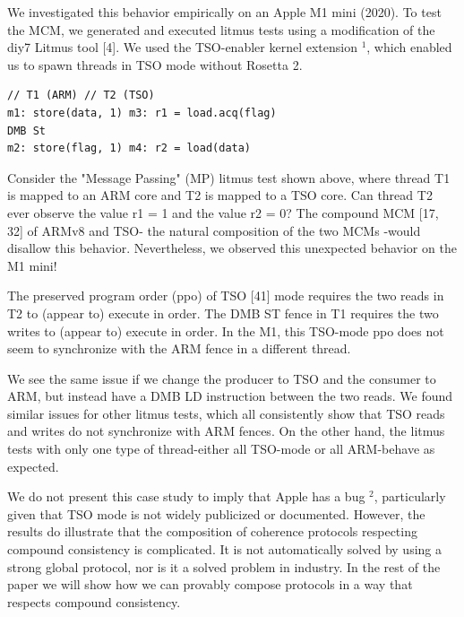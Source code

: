 \documentclass[10pt]{article}
\begin{document}
We investigated this behavior empirically on an Apple M1 mini (2020). To test the MCM, we generated and executed litmus tests using a modification of the diy7 Litmus tool [4]. We used the TSO-enabler kernel extension ${ }^{1}$, which enabled us to spawn threads in TSO mode without Rosetta 2.

\begin{lstlisting}[mathescape=true]
// T1 (ARM) // T2 (TSO)
m1: store(data, 1) m3: r1 = load.acq(flag)
DMB St
m2: store(flag, 1) m4: r2 = load(data)
\end{lstlisting}
Consider the "Message Passing" (MP) litmus test shown above, where thread T1 is mapped to an ARM core and T2 is mapped to a TSO core. Can thread T2 ever observe the value r1 = 1 and the value r2 = 0? The compound MCM [17, 32] of ARMv8 and TSO- the natural composition of the two MCMs -would disallow this behavior. Nevertheless, we observed this unexpected behavior on the M1 mini!

The preserved program order (ppo) of TSO [41] mode requires the two reads in T2 to (appear to) execute in order. The DMB ST fence in T1 requires the two writes to (appear to) execute in order. In the M1, this TSO-mode ppo does not seem to synchronize with the ARM fence in a different thread.

We see the same issue if we change the producer to TSO and the consumer to ARM, but instead have a DMB LD instruction between the two reads. We found similar issues for other litmus tests, which all consistently show that TSO reads and writes do not synchronize with ARM fences. On the other hand, the litmus tests with only one type of thread-either all TSO-mode or all ARM-behave as expected.

We do not present this case study to imply that Apple has a bug ${ }^{2}$, particularly given that TSO mode is not widely publicized or documented. However, the results do illustrate that the composition of coherence protocols respecting compound consistency is complicated. It is not automatically solved by using a strong global protocol, nor is it a solved problem in industry. In the rest of the paper we will show how we can provably compose protocols in a way that respects compound consistency.
\end{document}
